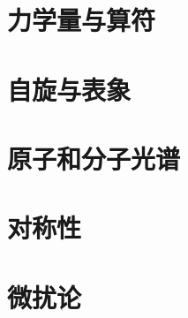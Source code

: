 \documentclass[twoside,b5paper,11pt]{book}
\begin{document}






\chapter{力学量与算符}










\chapter{自旋与表象}

%











\chapter{原子和分子光谱}









\chapter{对称性}







\chapter{微扰论}


\end{document}
